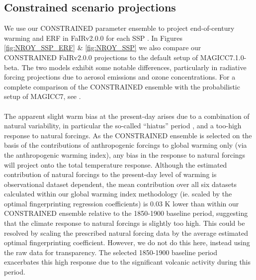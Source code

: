 \documentclass[gmd, manuscript]{copernicus}
\begin{document}
\subsection{Constrained scenario projections} \label{NROY_ssp}
We use our CONSTRAINED parameter ensemble to project end-of-century warming and ERF in FaIRv2.0.0 for each SSP \citep{Riahi2017}. In Figures \ref{fig:NROY_SSP_ERF} \& \ref{fig:NROY_SSP} we also compare our CONSTRAINED FaIRv2.0.0 projections to the default setup of MAGICC7.1.0-beta. The two models exhibit some notable differences, particularly in radiative forcing projections due to aerosol emissions and ozone concentrations. For a complete comparison of the CONSTRAINED ensemble with the probabilistic setup of MAGICC7, see \cite{Nicholls2021}. \\\\
%
The apparent slight warm bias at the present-day arises due to a combination of natural variability, in particular the so-called “hiatus” period \citep{Trenberth2013}, and a too-high response to natural forcings. As the CONSTRAINED ensemble is selected on the basis of the contributions of anthropogenic forcings to global warming only (via the anthropogenic warming index), any bias in the response to natural forcings will project onto the total temperature response. Although the estimated contribution of natural forcings to the present-day level of warming is observational dataset dependent, the mean contribution over all six datasets calculated within our global warming index methodology (ie. scaled by the optimal fingerprinting regression coefficients) is 0.03 K lower than within our CONSTRAINED ensemble relative to the 1850-1900 baseline period, suggesting that the climate response to natural forcings is slightly too high. This could be resolved by scaling the prescribed natural forcing data \citep{Smith2020c} by the average estimated optimal fingerprinting coefficient. However, we do not do this here, instead using the raw data for transparency. The selected 1850-1900 baseline period exacerbates this high response due to the significant volcanic activity during this period. \\\\
%
\end{document}
